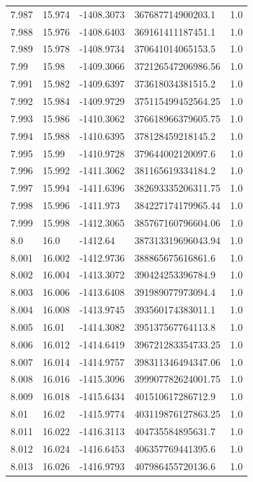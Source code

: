 \begin{tabular}{lllll}
7.987 & 15.974 & -1408.3073 & 367687714900203.1 & 1.0 \\
7.988 & 15.976 & -1408.6403 & 369161411187451.1 & 1.0 \\
7.989 & 15.978 & -1408.9734 & 370641014065153.5 & 1.0 \\
7.99 & 15.98 & -1409.3066 & 372126547206986.56 & 1.0 \\
7.991 & 15.982 & -1409.6397 & 373618034381515.2 & 1.0 \\
7.992 & 15.984 & -1409.9729 & 375115499452564.25 & 1.0 \\
7.993 & 15.986 & -1410.3062 & 376618966379605.75 & 1.0 \\
7.994 & 15.988 & -1410.6395 & 378128459218145.2 & 1.0 \\
7.995 & 15.99 & -1410.9728 & 379644002120097.6 & 1.0 \\
7.996 & 15.992 & -1411.3062 & 381165619334184.2 & 1.0 \\
7.997 & 15.994 & -1411.6396 & 382693335206311.75 & 1.0 \\
7.998 & 15.996 & -1411.973 & 384227174179965.44 & 1.0 \\
7.999 & 15.998 & -1412.3065 & 385767160796604.06 & 1.0 \\
8.0 & 16.0 & -1412.64 & 387313319696043.94 & 1.0 \\
8.001 & 16.002 & -1412.9736 & 388865675616861.6 & 1.0 \\
8.002 & 16.004 & -1413.3072 & 390424253396784.9 & 1.0 \\
8.003 & 16.006 & -1413.6408 & 391989077973094.4 & 1.0 \\
8.004 & 16.008 & -1413.9745 & 393560174383011.1 & 1.0 \\
8.005 & 16.01 & -1414.3082 & 395137567764113.8 & 1.0 \\
8.006 & 16.012 & -1414.6419 & 396721283354733.25 & 1.0 \\
8.007 & 16.014 & -1414.9757 & 398311346494347.06 & 1.0 \\
8.008 & 16.016 & -1415.3096 & 399907782624001.75 & 1.0 \\
8.009 & 16.018 & -1415.6434 & 401510617286712.9 & 1.0 \\
8.01 & 16.02 & -1415.9774 & 403119876127863.25 & 1.0 \\
8.011 & 16.022 & -1416.3113 & 404735584895631.7 & 1.0 \\
8.012 & 16.024 & -1416.6453 & 406357769441395.6 & 1.0 \\
8.013 & 16.026 & -1416.9793 & 407986455720136.6 & 1.0 \\

\end{tabular}
